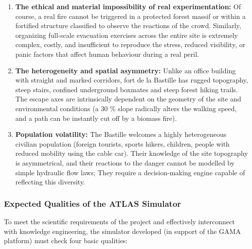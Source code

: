 \documentclass{article}
\begin{document}
\begin{enumerate}
\item \textbf {The ethical and material impossibility of real experimentation:} Of course, a real fire cannot be triggered in a protected forest massif or within a fortified structure classified to observe the reactions of the crowd. Similarly, organizing full-scale evacuation exercises across the entire site is extremely complex, costly, and insufficient to reproduce the stress, reduced visibility, or panic factors that affect human behaviour during a real peril.
\item \textbf {The heterogeneity and spatial asymmetry:} Unlike an office building with straight and marked corridors, fort de la Bastille has rugged topography, steep stairs, confined underground boxmates and steep forest hiking trails. The escape axes are intrinsically dependent on the geometry of the site and environmental conditions (a 30 \% slope radically alters the walking speed, and a path can be instantly cut off by a biomass fire).
\item \textbf {Population volatility:} The Bastille welcomes a highly heterogeneous civilian population (foreign tourists, sports hikers, children, people with reduced mobility using the cable car). Their knowledge of the site topography is asymmetrical, and their reactions to the danger cannot be modelled by simple hydraulic flow laws; They require a decision-making engine capable of reflecting this diversity.
\end{enumerate}

\subsubsection{Expected Qualities of the ATLAS Simulator}

To meet the scientific requirements of the project and effectively interconnect with knowledge engineering, the simulator developed (in support of the GAMA platform) must check four basic qualities:
\end{document}

